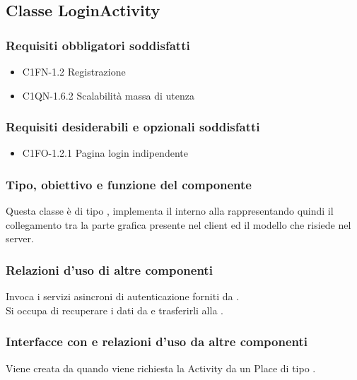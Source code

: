 \subsection{Classe LoginActivity}
\subsubsection*{Requisiti obbligatori soddisfatti}
\begin{itemize}
	\item C1FN-1.2 Registrazione
	\item C1QN-1.6.2 Scalabilit\`a massa di utenza
\end{itemize}
\subsubsection*{Requisiti desiderabili e opzionali soddisfatti}
\begin{itemize}
    \item C1FO-1.2.1 Pagina login indipendente
\end{itemize}
\subsubsection*{Tipo, obiettivo e funzione del componente}
Questa classe \`e di tipo , implementa il 
interno alla  rappresentando quindi il collegamento tra la parte
grafica presente nel client ed il modello che risiede nel server.
\subsubsection*{Relazioni d'uso di altre componenti} Invoca i servizi
asincroni di autenticazione forniti da .\\ Si occupa di
recuperare i dati da  e trasferirli alla . 
\subsubsection*{Interfacce con e relazioni d'uso da altre componenti} 
Viene creata da  quando viene richiesta la Activity da
un Place di tipo .
